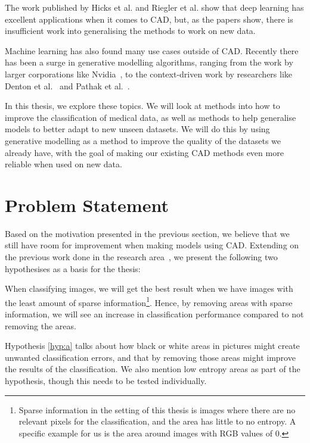 The work published by Hicks et al. and Riegler et al. show that deep learning has excellent applications when it comes to CAD, but, as the papers show, there is insufficient work into generalising the methods to work on new data.


Machine learning has also found many use cases outside of CAD. Recently there has been a surge in generative modelling algorithms, ranging from the work by larger corporations like Nvidia~\cite{DBLP:journals/corr/abs-1812-04948}, to the context-driven work by researchers like Denton et al.~\cite{DBLP:journals/corr/DentonGF16} and Pathak et al.~\cite{DBLP:journals/corr/PathakKDDE16}.


In this thesis, we explore these topics. We will look at methods into how to improve the classification of medical data, as well as methods to help generalise models to better adapt to new unseen datasets. We will do this by using generative modelling as a method to improve the quality of the datasets we already have, with the goal of making our existing CAD methods even more reliable when used on new data.


\section{Problem Statement}
\label{cha:problemstatement}
Based on the motivation presented in the previous section, we believe that we still have room for improvement when making models using CAD. Extending on the previous work done in the research area~\cite{25956,25953,riegler2016eir}, we present the following two hypothesises as a basis for the thesis:

\noindent
\begin{hyp} \label{hyp:a}
When classifying images, we will get the best result when we have images with the least amount of sparse information\footnote{Sparse information in the setting of this thesis is images where there are no relevant pixels for the classification, and the area has little to no entropy. A specific example for us is the area around images with RGB values of 0.}. 
Hence, by removing areas with sparse information,
we will see an increase in classification performance compared to not removing the areas.
\end{hyp}

\noindent
Hypothesis \ref{hyp:a} talks about how black or white areas in pictures might create unwanted classification errors, and that by removing those areas might improve the results of the classification. We also mention low entropy areas as part of the hypothesis, though this needs to be tested individually.


